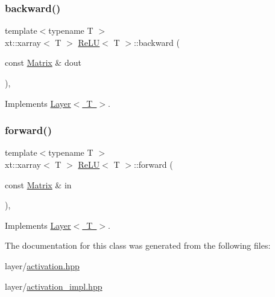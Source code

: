 \subsubsection{\texorpdfstring{backward()}{backward()}}
{\footnotesize\ttfamily template$<$typename T $>$ \\
xt\+::xarray$<$ T $>$ \mbox{\hyperlink{class_re_l_u}{Re\+LU}}$<$ T $>$\+::backward (\begin{DoxyParamCaption}\item[{const \mbox{\hyperlink{class_re_l_u_a3d1448f06335a4ab7227ec31a43a410f}{Matrix}} \&}]{dout }\end{DoxyParamCaption})\hspace{0.3cm}{\ttfamily [override]}, {\ttfamily [virtual]}}



Implements \mbox{\hyperlink{class_layer_ac4c13a3a85bfdd4d7d4d18669e3299fe}{Layer$<$ T $>$}}.

\mbox{\label{class_re_l_u_aef903f5e7d309e76f49abc34043354ce}} 
\subsubsection{\texorpdfstring{forward()}{forward()}}
{\footnotesize\ttfamily template$<$typename T $>$ \\
xt\+::xarray$<$ T $>$ \mbox{\hyperlink{class_re_l_u}{Re\+LU}}$<$ T $>$\+::forward (\begin{DoxyParamCaption}\item[{const \mbox{\hyperlink{class_re_l_u_a3d1448f06335a4ab7227ec31a43a410f}{Matrix}} \&}]{in }\end{DoxyParamCaption})\hspace{0.3cm}{\ttfamily [override]}, {\ttfamily [virtual]}}



Implements \mbox{\hyperlink{class_layer_ab15b665c86974b1cf1d7ba4e309cb0e5}{Layer$<$ T $>$}}.



The documentation for this class was generated from the following files\+:\begin{DoxyCompactItemize}
\item 
layer/\mbox{\hyperlink{activation_8hpp}{activation.\+hpp}}\item 
layer/\mbox{\hyperlink{activation__impl_8hpp}{activation\+\_\+impl.\+hpp}}\end{DoxyCompactItemize}
